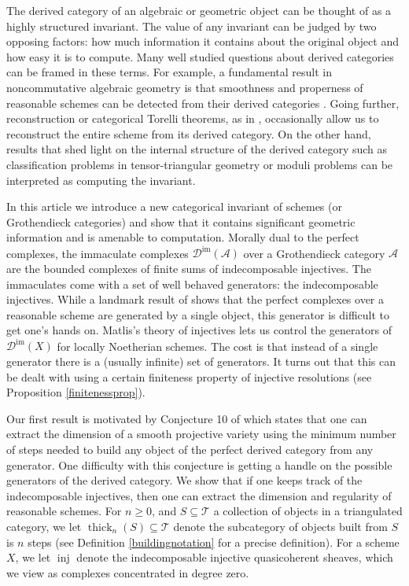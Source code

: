 \documentclass[12pt,oneside]{amsart}
\DeclareMathOperator{\thick}{thick}
\DeclareMathOperator{\inj}{inj}
\DeclareMathOperator{\immac}{im}
\begin{document}
The derived category of an algebraic or geometric object can be thought of as a highly structured invariant. The value of any invariant can be judged by two opposing factors:  how much information it contains about the original object and how easy it is to compute. Many well studied questions about derived categories can be framed in these terms. For example, a fundamental result in noncommutative algebraic geometry is that smoothness and properness of reasonable schemes can be detected from their derived categories \cite{Orl16}. Going further, reconstruction or categorical Torelli theorems, as in \cite{BO01}, occasionally allow us to reconstruct the entire scheme from its derived category. On the other hand, results that shed light on the internal structure of the derived category such as classification problems in tensor-triangular geometry \cite{Nee92} or moduli problems can be interpreted as computing the invariant. 


In this article we introduce a new categorical invariant of schemes (or Grothendieck categories) and show that it contains significant geometric information and is amenable to computation. Morally dual to the perfect complexes, the immaculate complexes $\mathcal{D}^{\immac}(\mathcal{A})$ over a Grothendieck category $\mathcal{A}$ are the bounded complexes of finite sums of indecomposable injectives. The immaculates come with a set of well behaved generators: the indecomposable injectives. While a landmark result of \cite{VB02} shows that the perfect complexes over a reasonable scheme are generated by a single object, this generator is difficult to get one's hands on. Matlis's theory of injectives lets us control the generators of $\mathcal{D}^{\immac}(X)$ for locally Noetherian schemes. The cost is that instead of a single generator there is a (usually infinite) set of generators. It turns out that this can be dealt with using a certain finiteness property of injective resolutions (see Proposition \ref{finitenessprop}). 

Our first result is motivated by Conjecture 10 of \cite{Orl09} which states that one can extract the dimension of a smooth projective variety using the minimum number of steps needed to build any object of the perfect derived category from any generator. One difficulty with this conjecture is getting a handle on the possible generators of the derived category. We show that if one keeps track of the indecomposable injectives, then one can extract the dimension and regularity of reasonable schemes. For $n \geq 0$, and $S \subseteq \mathcal{T}$ a collection of objects in a triangulated category, we let $\thick_n(S) \subseteq \mathcal{T}$ denote the subcategory of objects built from $S$ is $n$ steps (see Definition \ref{buildingnotation} for a precise definition). For a scheme $X$, we let $\inj$ denote the indecomposable injective quasicoherent sheaves, which we view as complexes concentrated in degree zero. 
\end{document}
